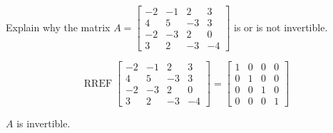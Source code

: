 
\begin{exerciseStatement}


Explain why the matrix \(A= \left[\begin{array}{cccc}
-2 & -1 & 2 & 3 \\
4 & 5 & -3 & 3 \\
-2 & -3 & 2 & 0 \\
3 & 2 & -3 & -4
\end{array}\right] \) is or is not invertible.


\end{exerciseStatement}
    
\begin{exerciseAnswer} 


\[\operatorname{RREF} \left[\begin{array}{cccc}
-2 & -1 & 2 & 3 \\
4 & 5 & -3 & 3 \\
-2 & -3 & 2 & 0 \\
3 & 2 & -3 & -4
\end{array}\right] = \left[\begin{array}{cccc}
1 & 0 & 0 & 0 \\
0 & 1 & 0 & 0 \\
0 & 0 & 1 & 0 \\
0 & 0 & 0 & 1
\end{array}\right] \]

\(A\) is invertible.
\end{exerciseAnswer}
    
